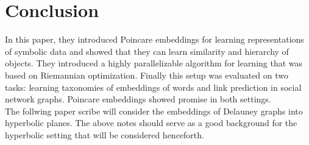 \section{Conclusion}
In this paper, they introduced Poincare embeddings for learning representations of symbolic data and showed that they can learn similarity and hierarchy of objects. They introduced a highly parallelizable algorithm for learning that was based on Riemannian optimization. Finally this setup was evaluated on two tasks: learning taxonomies of embeddings of words and link prediction in social network graphs. Poincare embeddings showed promise in both settings. 
\\ The follwing paper scribe will consider the embeddings of Delauney graphs into hyperbolic planes. The above notes should serve as a good background for the hyperbolic setting that will be considered henceforth.